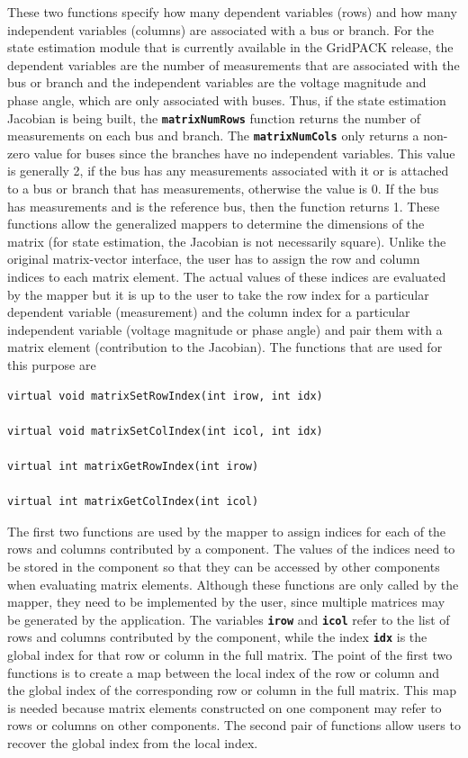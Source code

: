 \documentclass[12pt]{report} %
\begin{document}
These two functions specify how many dependent variables (rows) and how many independent variables (columns) are associated with a bus or branch. For the state estimation module that is currently available in the GridPACK release, the dependent variables are the  number of measurements that are associated with the bus or branch and the independent variables are the voltage magnitude and phase angle, which are only associated with buses. Thus, if the state estimation Jacobian is being built, the \texttt{\textbf{matrixNumRows}} function returns the number of measurements on each bus and branch. The \texttt{\textbf{matrixNumCols}} only returns a non-zero value for buses since the branches have no independent variables. This value is generally 2, if the bus has any measurements associated with it or is attached to a bus or branch that has measurements, otherwise the value is 0. If the bus has measurements and is the reference bus, then the function returns 1. These functions allow the generalized mappers to determine the dimensions of the matrix (for state estimation, the Jacobian is not necessarily square).
Unlike the original matrix-vector interface, the user has to assign the row and column indices to each matrix element. The actual values of these indices are evaluated by the mapper but it is up to the user to take the row index for a particular dependent variable (measurement) and the column index for a particular independent variable (voltage magnitude or phase angle) and pair them with a matrix element (contribution to the Jacobian). The functions that are used for this purpose are

{
\color{red}
\begin{Verbatim}[fontseries=b]
virtual void matrixSetRowIndex(int irow, int idx)

virtual void matrixSetColIndex(int icol, int idx)

virtual int matrixGetRowIndex(int irow)

virtual int matrixGetColIndex(int icol)
\end{Verbatim}
}

The first two functions are used by the mapper to assign indices for each of the rows and columns contributed by a component. The values of the indices need to be stored in the component so that they can be accessed by other components when evaluating matrix elements. Although these functions are only called by the mapper, they need to be implemented by the user, since multiple matrices may be generated by the application. The variables \texttt{\textbf{irow}} and \texttt{\textbf{icol}} refer to the list of rows and columns contributed by the component, while the index \texttt{\textbf{idx}} is the global index for that row or column in the full matrix. The point of the first two functions is to create a map between the local index of the row or column and the global index of the corresponding row or column in the full matrix. This map is needed because matrix elements constructed on one component may refer to rows or columns on other components. The second pair of functions allow users to recover the global index from the local index.
\end{document}

